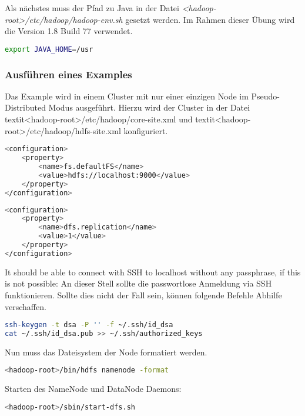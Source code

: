 Als nächstes muss der Pfad zu Java in der Datei \textit{<hadoop-root>/etc/hadoop/hadoop-env.sh} gesetzt werden. Im Rahmen dieser Übung wird die Version 1.8 Build 77 verwendet.

\begin{lstlisting}[frame=single, language=bash, caption=Setzen des Java Pfades in <hadoop-root>/etc/hadoop/hadoop-env.sh]
export JAVA_HOME=/usr
\end{lstlisting}


\subsubsection{Ausführen eines Examples}
\label{subsubsec:Ausführen eines Examples}
Das Example wird in einem Cluster mit nur einer einzigen Node im Pseudo-Distributed Modus ausgeführt.
Hierzu wird der Cluster in der Datei textit{<hadoop-root>/etc/hadoop/core-site.xml} und textit{<hadoop-root>/etc/hadoop/hdfs-site.xml} konfiguriert.
\begin{lstlisting}[language=bash, caption=Setzen des Hosts in <hadoop-root>/etc/hadoop/core-site.xml]
<configuration>
	<property>
		<name>fs.defaultFS</name>
		<value>hdfs://localhost:9000</value>
	</property>
</configuration>
\end{lstlisting}

\begin{lstlisting}[language=bash, caption=Setzen der Anzahl der Replikate in <hadoop-root>/etc/hadoop/hdfs-site.xml]
<configuration>
	<property>
		<name>dfs.replication</name>
		<value>1</value>
	</property>
</configuration>
\end{lstlisting}

It should be able to connect with SSH to localhost without any passphrase, if this is not possible:
An dieser Stell sollte die passwortlose Anmeldung via SSH funktionieren. Sollte dies nicht der Fall sein, können folgende Befehle Abhilfe verschaffen.
\begin{lstlisting}[language=bash, caption=SSH Konfiguration]
ssh-keygen -t dsa -P '' -f ~/.ssh/id_dsa
cat ~/.ssh/id_dsa.pub >> ~/.ssh/authorized_keys
\end{lstlisting}

Nun muss das Dateisystem der Node formatiert werden.
\begin{lstlisting}[language=bash, caption=Formatieren des Dateisystems]
<hadoop-root>/bin/hdfs namenode -format
\end{lstlisting}

Starten des NameNode und DataNode Daemons:
\begin{lstlisting}[language=bash, caption=Starten des NameNode und DataNode Daemons]
<hadoop-root>/sbin/start-dfs.sh
\end{lstlisting}

